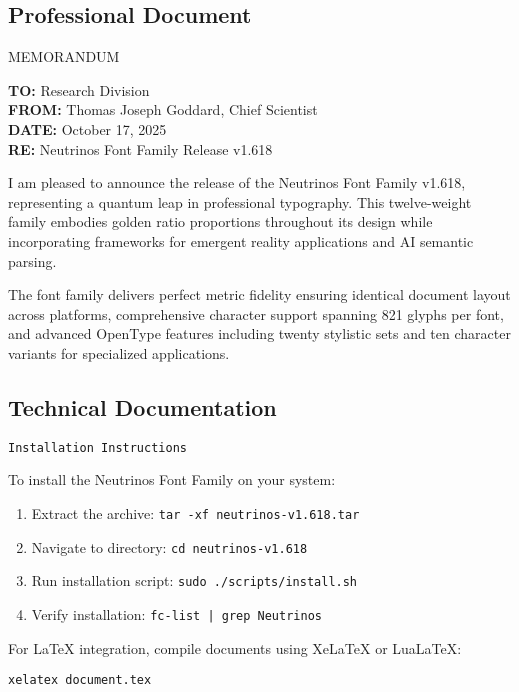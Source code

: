 \documentclass[11pt,letterpaper]{article}
\begin{document}
\subsection{Professional Document}

\begin{tcolorbox}[colback=neutrinoblue!5,colframe=neutrinoblue]
{\semiboldfont\large MEMORANDUM}

\textbf{TO:} Research Division\\
\textbf{FROM:} Thomas Joseph Goddard, Chief Scientist\\
\textbf{DATE:} October 17, 2025\\
\textbf{RE:} Neutrinos Font Family Release v1.618

I am pleased to announce the release of the Neutrinos Font Family v1.618, representing a quantum leap in professional typography. This twelve-weight family embodies golden ratio proportions throughout its design while incorporating frameworks for emergent reality applications and AI semantic parsing.

The font family delivers perfect metric fidelity ensuring identical document layout across platforms, comprehensive character support spanning 821 glyphs per font, and advanced OpenType features including twenty stylistic sets and ten character variants for specialized applications.
\end{tcolorbox}

\subsection{Technical Documentation}

{\mediumfont
\texttt{Installation Instructions}

To install the Neutrinos Font Family on your system:

\begin{enumerate}[leftmargin=1.5cm]
    \item Extract the archive: \texttt{tar -xf neutrinos-v1.618.tar}
    \item Navigate to directory: \texttt{cd neutrinos-v1.618}
    \item Run installation script: \texttt{sudo ./scripts/install.sh}
    \item Verify installation: \texttt{fc-list | grep Neutrinos}
\end{enumerate}

For LaTeX integration, compile documents using XeLaTeX or LuaLaTeX:

\texttt{xelatex document.tex}
}
\end{document}
